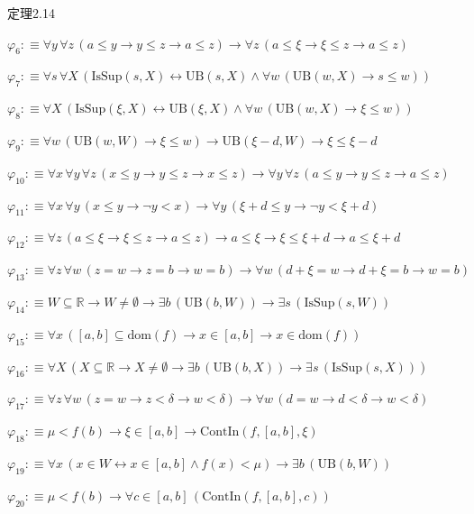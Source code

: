 \begin{fullproof}{定理2.14}
\begin{abbrevlist}
\item $\varphi_{6} :\equiv \forall y\,\forall z\,(a \leq y \to y \leq z \to a \leq z) \to \forall z\,(a \leq \xi \to \xi \leq z \to a \leq z)$
\item $\varphi_{7} :\equiv \forall s\,\forall X\,(\mathrm{IsSup}(s,X) \leftrightarrow \mathrm{UB}(s,X) \land \forall w\,(\mathrm{UB}(w,X) \to s \leq w))$
\item $\varphi_{8} :\equiv \forall X\,(\mathrm{IsSup}(\xi,X) \leftrightarrow \mathrm{UB}(\xi,X) \land \forall w\,(\mathrm{UB}(w,X) \to \xi \leq w))$
\item $\varphi_{9} :\equiv \forall w\,(\mathrm{UB}(w,W) \to \xi \leq w) \to \mathrm{UB}(\xi - d,W) \to \xi \leq \xi - d$
\item $\varphi_{10} :\equiv \forall x\,\forall y\,\forall z\,(x \leq y \to y \leq z \to x \leq z) \to \forall y\,\forall z\,(a \leq y \to y \leq z \to a \leq z)$
\item $\varphi_{11} :\equiv \forall x\,\forall y\,(x \leq y \to \neg y < x) \to \forall y\,(\xi + d \leq y \to \neg y < \xi + d)$
\item $\varphi_{12} :\equiv \forall z\,(a \leq \xi \to \xi \leq z \to a \leq z) \to a \leq \xi \to \xi \leq \xi + d \to a \leq \xi + d$
\item $\varphi_{13} :\equiv \forall z\,\forall w\,(z = w \to z = b \to w = b) \to \forall w\,(d + \xi = w \to d + \xi = b \to w = b)$
\item $\varphi_{14} :\equiv W \subseteq \mathbb{R} \to W \neq \emptyset \to \exists b\,(\mathrm{UB}(b,W)) \to \exists s\,(\mathrm{IsSup}(s,W))$
\item $\varphi_{15} :\equiv \forall x\,([a,b] \subseteq \mathrm{dom}(f) \to x \in [a,b] \to x \in \mathrm{dom}(f))$
\item $\varphi_{16} :\equiv \forall X\,(X \subseteq \mathbb{R} \to X \neq \emptyset \to \exists b\,(\mathrm{UB}(b,X)) \to \exists s\,(\mathrm{IsSup}(s,X)))$
\item $\varphi_{17} :\equiv \forall z\,\forall w\,(z = w \to z < \delta \to w < \delta) \to \forall w\,(d = w \to d < \delta \to w < \delta)$
\item $\varphi_{18} :\equiv \mu < f(b) \to \xi \in [a,b] \to \mathrm{ContIn}(f,[a,b],\xi)$
\item $\varphi_{19} :\equiv \forall x\,(x \in W \leftrightarrow x \in [a,b] \land f(x) < \mu) \to \exists b\,(\mathrm{UB}(b,W))$
\item $\varphi_{20} :\equiv \mu < f(b) \to \forall c \in [a,b]\,(\mathrm{ContIn}(f,[a,b],c))$

\end{abbrevlist}
\end{fullproof}
